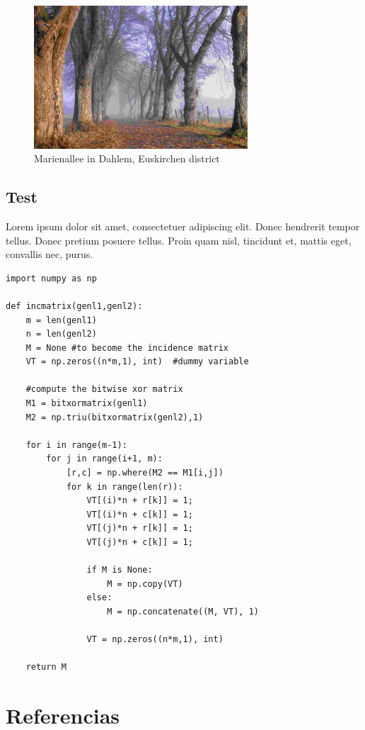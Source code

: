 \documentclass[11pt]{article}
\begin{document}
\begin{figure}[htbp]
\centering
\includegraphics[width=8cm]{images/2019-11-30-Marienallee_Dahlem-7978.jpg}
\caption{Marienallee in Dahlem, Euskirchen district}
\end{figure}

\subsection{Test}
\label{sec:org7e9d598}
Lorem ipsum dolor sit amet, consectetuer adipiscing elit.  Donec 
hendrerit tempor tellus.  Donec pretium posuere tellus.  Proin quam 
nisl, tincidunt et, mattis eget, convallis nec, purus.  

\begin{verbatim}
import numpy as np

def incmatrix(genl1,genl2):
    m = len(genl1)
    n = len(genl2)
    M = None #to become the incidence matrix
    VT = np.zeros((n*m,1), int)  #dummy variable

    #compute the bitwise xor matrix
    M1 = bitxormatrix(genl1)
    M2 = np.triu(bitxormatrix(genl2),1) 

    for i in range(m-1):
        for j in range(i+1, m):
            [r,c] = np.where(M2 == M1[i,j])
            for k in range(len(r)):
                VT[(i)*n + r[k]] = 1;
                VT[(i)*n + c[k]] = 1;
                VT[(j)*n + r[k]] = 1;
                VT[(j)*n + c[k]] = 1;

                if M is None:
                    M = np.copy(VT)
                else:
                    M = np.concatenate((M, VT), 1)

                VT = np.zeros((n*m,1), int)

    return M
\end{verbatim}

\section{Referencias}
\label{sec:orga23ac63}
\printbibliography[heading=none]
\end{document}
